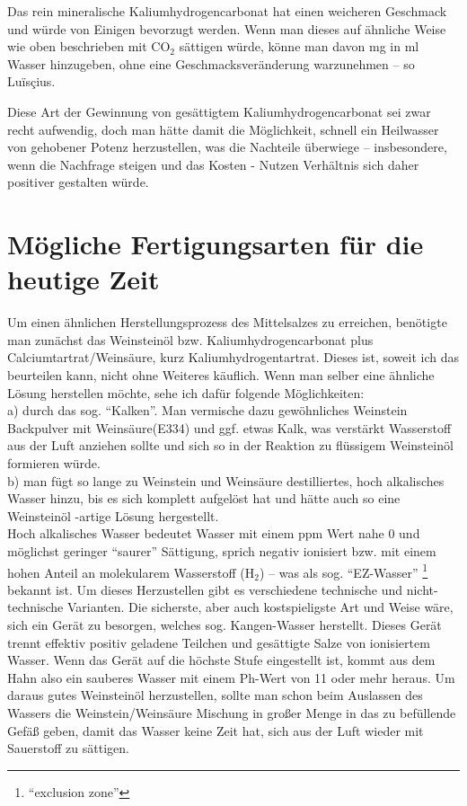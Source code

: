 \documentclass[a5paper,fontsize=10pt]{memoir}
\newcommand\ouncesofpound{12}
\newcommand\quentinsofounce{8}
\newcommand\gransofquentins{63}
\newcommand\gramsofpound{372}
\newcommand\gramofounce{\fpeval{\gramsofpound / \ouncesofpound}}
\newcommand\gramofgran{\fpeval{\gramsofpound / \ouncesofpound / \quentinsofounce / \gransofquentins}}
\begin{document}
\FPeval\x{round(16*\gramofounce:0)}%
\FPeval\x{round(3*\gramofgran*1000:0)}%
Das rein mineralische Kaliumhydrogencarbonat hat einen weicheren Geschmack und würde von Einigen bevorzugt werden. Wenn man dieses auf ähnliche Weise wie oben beschrieben mit CO$_2$ sättigen würde, könne man davon \numprint{\x} mg in \numprint{\a} ml Wasser hinzugeben, ohne eine Geschmacksveränderung warzunehmen -- so Luïsçius.

Diese Art der Gewinnung von gesättigtem Kaliumhydrogencarbonat sei zwar recht aufwendig, doch man hätte damit die Möglichkeit, schnell ein Heilwasser von gehobener Potenz herzustellen, was die Nachteile überwiege -- insbesondere, wenn die Nachfrage steigen und das Kosten - Nutzen Verhältnis sich daher positiver gestalten würde.


\section{Mögliche Fertigungsarten für die heutige Zeit}

Um einen ähnlichen Herstellungsprozess des Mittelsalzes zu erreichen, benötigte man zunächst das Weinsteinöl bzw. Kaliumhydrogencarbonat plus Calciumtartrat/Weinsäure, kurz Kaliumhydrogentartrat. Dieses ist, soweit ich das beurteilen kann, nicht ohne Weiteres käuflich. Wenn man selber eine ähnliche Lösung herstellen möchte, sehe ich dafür folgende Möglichkeiten:\\

a) durch das sog. ``Kalken''.
Man vermische dazu gewöhnliches Weinstein Backpulver
mit Weinsäure(E334) und ggf. etwas Kalk,
was verstärkt Wasserstoff aus der Luft anziehen sollte
und sich so in der Reaktion
zu flüssigem Weinsteinöl formieren würde.\\

b) man fügt so lange zu Weinstein und Weinsäure
destilliertes, hoch alkalisches Wasser hinzu,
bis es sich komplett aufgelöst hat
und hätte auch so eine Weinsteinöl%
\hyp{}artige Lösung hergestellt.\\

Hoch alkalisches Wasser bedeutet Wasser mit einem ppm Wert nahe 0 und möglichst geringer ``saurer'' Sättigung, sprich negativ ionisiert bzw. mit einem hohen Anteil an molekularem Wasserstoff (H$_2$) -- was als sog. ``EZ-Wasser''%
\footnote{``exclusion zone''}
bekannt ist. Um dieses Herzustellen gibt es verschiedene technische und nicht-technische Varianten. Die sicherste, aber auch kostspieligste Art und Weise wäre, sich ein Gerät zu besorgen, welches sog. Kangen-Wasser herstellt. Dieses Gerät trennt effektiv positiv geladene Teilchen und gesättigte Salze von ionisiertem Wasser. Wenn das Gerät auf die höchste Stufe eingestellt ist, kommt aus dem Hahn also ein sauberes Wasser mit einem Ph-Wert von 11 oder mehr heraus. Um daraus gutes Weinsteinöl herzustellen, sollte man schon beim Auslassen des Wassers die Weinstein/Weinsäure Mischung in großer Menge in das zu befüllende Gefäß geben, damit das Wasser keine Zeit hat, sich aus der Luft wieder mit Sauerstoff zu sättigen.
\end{document}
